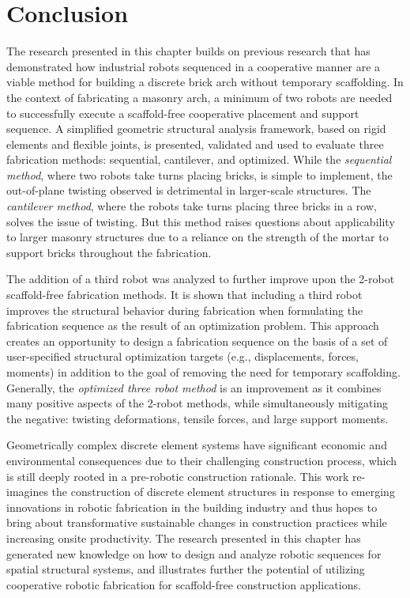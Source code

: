 \section{Conclusion} \label{conclusion}
The research presented in this chapter builds on previous research \cite{han_concept_2020,parascho_robotic_2020, parascho_lightvault_2021} that has demonstrated how industrial robots sequenced in a cooperative manner are a viable method for building a discrete brick arch without temporary scaffolding. In the context of fabricating a masonry arch, a minimum of two robots are needed to successfully execute a scaffold-free cooperative placement and support sequence. A simplified geometric structural analysis framework, based on rigid elements and flexible joints, is presented, validated and used to evaluate three fabrication methods: sequential, cantilever, and optimized. While the \textit{sequential method}, where two robots take turns placing bricks, is simple to implement, the out-of-plane twisting observed is detrimental in larger-scale structures. The \textit{cantilever method}, where the robots take turns placing three bricks in a row, solves the issue of twisting. But this method raises questions about applicability to larger masonry structures due to a reliance on the strength of the mortar to support bricks throughout the fabrication.

The addition of a third robot was analyzed to further improve upon the 2-robot scaffold-free fabrication methods. It is shown that including a third robot improves the structural behavior during fabrication when formulating the fabrication sequence as the result of an optimization problem. This approach creates an opportunity to design a fabrication sequence on the basis of a set of user-specified structural optimization targets (e.g., displacements, forces, moments) in addition to the goal of removing the need for temporary scaffolding. Generally, the \textit{optimized three robot method} is an improvement as it combines many positive aspects of the 2-robot methods, while simultaneously mitigating the negative: twisting deformations, tensile forces, and large support moments.

Geometrically complex discrete element systems have significant economic and environmental consequences due to their challenging construction process, which is still deeply rooted in a pre-robotic construction rationale. This work re-imagines the construction of discrete element structures in response to emerging innovations in robotic fabrication in the building industry and thus hopes to bring about transformative sustainable changes in construction practices while increasing onsite productivity. The research presented in this chapter has generated new knowledge on how to design and analyze robotic sequences for spatial structural systems, and illustrates further the potential of utilizing cooperative robotic fabrication for scaffold-free construction applications.

